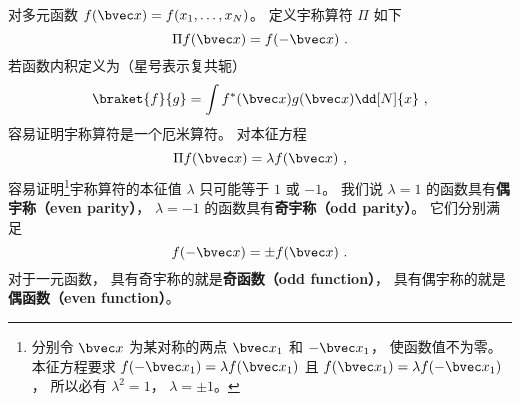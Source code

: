 

对多元函数 $f(\bvec x) = f(x_1, \dots, x_N)$。  定义宇称算符 $\Pi$ 如下
\begin{equation}
\Pi f(\bvec x) = f(-\bvec x)~.
\end{equation}
若函数内积定义为（星号表示复共轭）
\begin{equation}
\braket{f}{g} = \int f^*(\bvec x) g(\bvec x) \dd[N]{x}~,
\end{equation}
容易证明宇称算符是一个厄米算符。%
对本征方程
\begin{equation}
\Pi f(\bvec x) = \lambda f(\bvec x)~,
\end{equation}
容易证明\footnote{分别令 $\bvec x$ 为某对称的两点 $\bvec x_1$ 和 $-\bvec x_1$， 使函数值不为零。 本征方程要求 $f(-\bvec x_1) = \lambda f(\bvec x_1)$ 且 $f(\bvec x_1) = \lambda f(-\bvec x_1)$， 所以必有 $\lambda^2 = 1$， $\lambda = \pm 1$。}宇称算符的本征值 $\lambda$ 只可能等于 $1$ 或 $-1$。 我们说 $\lambda = 1$ 的函数具有\textbf{偶宇称（even parity）}， $\lambda = -1$ 的函数具有\textbf{奇宇称（odd parity）}。 它们分别满足
\begin{equation}
f(-\bvec x) = \pm f(\bvec x)~.
\end{equation}
对于一元函数， 具有奇宇称的就是\textbf{奇函数（odd function）}， 具有偶宇称的就是\textbf{偶函数（even function）}。
